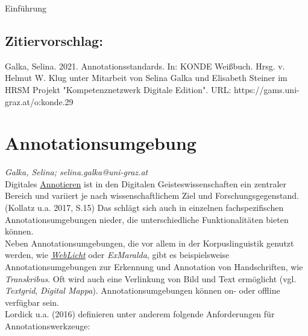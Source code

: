 \documentclass{article}
\begin{document}
Einführung\subsection*{Zitiervorschlag:}Galka, Selina. 2021. Annotationsstandards. In: KONDE Weißbuch. Hrsg. v. Helmut W. Klug unter Mitarbeit von Selina Galka und Elisabeth Steiner im HRSM Projekt "Kompetenznetzwerk Digitale Edition". URL: https://gams.uni-graz.at/o:konde.29\newpage\section*{Annotationsumgebung} \emph{Galka, Selina; selina.galka@uni-graz.at }\\
        
    Digitales \href{http://gams.uni-graz.at/o:konde.17}{Annotieren} ist in den Digitalen Geisteswissenschaften ein zentraler Bereich und variiert je nach wissenschaftlichem Ziel und Forschungsgegenstand. (Kollatz u.a. 2017, S.15) Das schlägt sich auch in einzelnen fachspezifischen Annotationsumgebungen nieder, die unterschiedliche Funktionalitäten bieten können.\\
            
        Neben Annotationsumgebungen, die vor allem in der Korpuslinguistik genutzt werden, wie \emph{\href{http://gams.uni-graz.at/o:konde.212}{WebLicht}} oder \emph{ExMaralda}, gibt es beispielsweise Annotationsumgebungen zur Erkennung und Annotation von Handschriften, wie \emph{Transkribus}. Oft wird auch eine Verlinkung von Bild und Text ermöglicht (vgl. \emph{Textgrid}, \emph{Digital Mappa}). Annotationsumgebungen können on- oder offline verfügbar sein.\\
            
        Lordick u.a. (2016) definieren unter anderem folgende Anforderungen für Annotationswerkzeuge:\\
            
\end{document}
